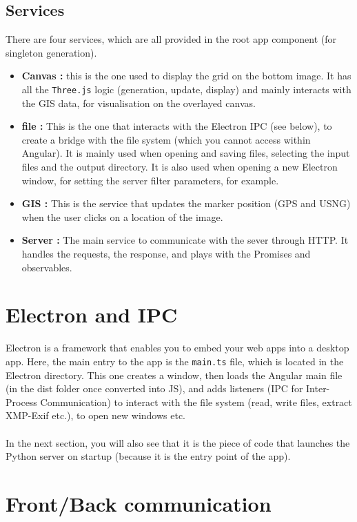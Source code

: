\documentclass[12pt,a4paper]{article}
\begin{document}
\subsection{Services}

There are four services, which are all provided in the root app component (for singleton generation).

\begin{itemize}
	\item \textbf{Canvas :} this is the one used to display the grid on the bottom image. It has all the \texttt{Three.js} logic (generation, update, display) and mainly interacts with the GIS data, for visualisation on the overlayed canvas.
	\item \textbf{file :} This is the one that interacts with the Electron IPC (see below), to create a bridge with the file system (which you cannot access within Angular). It is mainly used when opening and saving files, selecting the input files and the output directory. It is also used when opening a new Electron window, for setting the server filter parameters, for example.
	\item \textbf{GIS :} This is the service that updates the marker position (GPS and USNG) when the user clicks on a location of the image.
	\item \textbf{Server :} The main service to communicate with the sever through HTTP. It handles the requests, the response, and plays with the Promises and observables.
\end{itemize}

\section{Electron and IPC}

Electron is a framework that enables you to embed your web apps into a desktop app. Here, the main entry to the app is the \texttt{main.ts} file, which is located in the Electron directory. This one creates a window, then loads the Angular main file (in the dist folder once converted into JS), and adds listeners (IPC for Inter-Process Communication) to interact with the file system (read, write files, extract XMP-Exif etc.), to open new windows etc.\\
~\\
In the next section, you will also see that it is the piece of code that launches the Python server on startup (because it is the entry point of the app).

\section{Front/Back communication}
\end{document}
